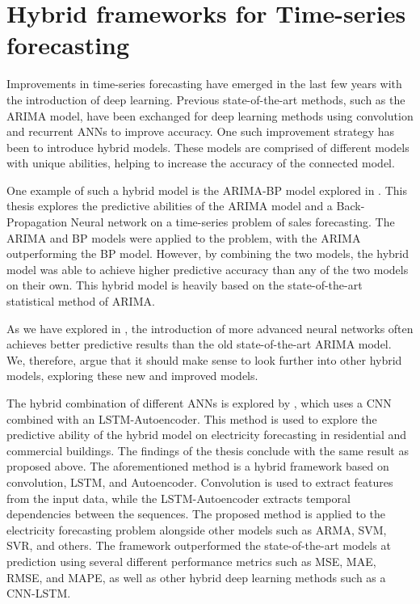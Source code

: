 \section{Hybrid frameworks for Time-series forecasting}
\label{section:RelatedWork:Hybrid}

Improvements in time-series forecasting have emerged in the last few years with the introduction of deep learning.
Previous state-of-the-art methods, such as the ARIMA model, have been exchanged for deep learning methods using convolution and recurrent ANNs to improve accuracy.
One such improvement strategy has been to introduce hybrid models.
These models are comprised of different models with unique abilities, helping to increase the accuracy of the connected model.


One example of such a hybrid model is the ARIMA-BP model explored in \cite{Bowen2020}.
This thesis explores the predictive abilities of the ARIMA model and a Back-Propagation Neural network on a time-series problem of sales forecasting.
The ARIMA and BP models were applied to the problem, with the ARIMA outperforming the BP model.
However, by combining the two models, the hybrid model was able to achieve higher predictive accuracy than any of the two models on their own.
This hybrid model is heavily based on the state-of-the-art statistical method of ARIMA.

As we have explored in , the introduction of more advanced neural networks often achieves better predictive results than the old state-of-the-art ARIMA model.
We, therefore, argue that it should make sense to look further into other hybrid models, exploring these new and improved models.


The hybrid combination of different ANNs is explored by \cite{Khan2020}, which uses a CNN combined with an LSTM-Autoencoder.
This method is used to explore the predictive ability of the hybrid model on electricity forecasting in residential and commercial buildings.
The findings of the thesis conclude with the same result as proposed above.
The aforementioned method is a hybrid framework based on convolution, LSTM, and Autoencoder.
Convolution is used to extract features from the input data, while the LSTM-Autoencoder extracts temporal dependencies between the sequences.
The proposed method is applied to the electricity forecasting problem alongside other models such as ARMA, SVM, SVR, and others.
The framework outperformed the state-of-the-art models at prediction using several different performance metrics such as MSE, MAE, RMSE, and MAPE,
as well as other hybrid deep learning methods such as a CNN-LSTM.


